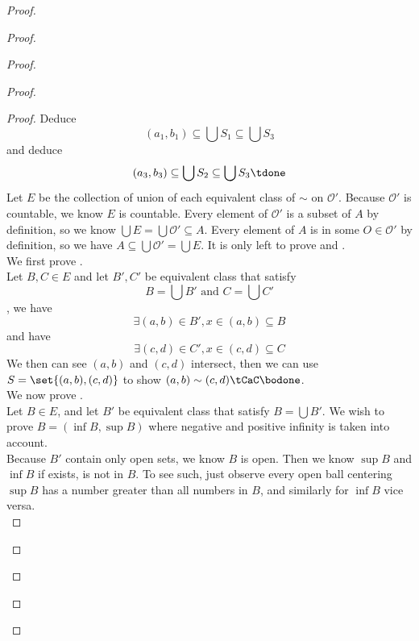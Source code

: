 \documentclass{report}
\begin{document}
\begin{proof}
\begin{proof}
\begin{proof}
\begin{proof}
\begin{proof}
Deduce
\begin{equation*}
  (a_1,b_1)\subseteq \bigcup S_1\subseteq \bigcup S_3
\end{equation*}
and deduce
\begin{equation*}
  (a_3,b_3)\subseteq \bigcup S_2\subseteq \bigcup S_3\tdone
\end{equation*}
Let $E$ be the collection of union of each equivalent class of $\sim$ on $\mathcal{O}'$. Because $\mathcal{O}'$ is countable, we know $E$ is countable. Every element of $\mathcal{O}'$ is a subset of $A$ by definition, so we know  $\bigcup E=\bigcup \mathcal{O}'\subseteq A$. Every element of $A$ is in some  $O\in \mathcal{O}'$ by definition, so we have $A\subseteq \bigcup \mathcal{O}'=\bigcup E$. It is only left to prove  and .\\

We first prove .\\

Let $B,C\in E$ and let $B',C'$ be equivalent class that satisfy
\begin{equation*}
B=\bigcup B'\text{ and }C=\bigcup C'
\end{equation*}
, we have
\begin{equation*}
\exists (a,b)\in B', x\in (a,b)\subseteq B
\end{equation*}
and have
\begin{equation*}
\exists (c,d)\in C',x \in (c,d)\subseteq C
\end{equation*}
We then can see $(a,b)$ and $(c,d)$ intersect, then we can use $S=\set{(a,b),(c,d)}$ to show $(a,b)\sim (c,d)\tCaC\bodone$.\\

We now prove  .\\
 
Let $B\in E$, and let $B'$ be equivalent class that satisfy  $B=\bigcup B'$. We wish to prove $B=(\inf B,\sup B)$ where negative and positive infinity is taken into account.\\

Because $B'$ contain only open sets, we know  $B$ is open. Then we know $\sup  B$ and $\inf B$ if exists, is not in $B$. To see such, just observe every open ball centering $\sup B$ has a number greater than all numbers in $B$, and similarly for $\inf B$ vice versa.\\


\end{proof}
\end{proof}
\end{proof}
\end{proof}
\end{proof}
\end{document}
